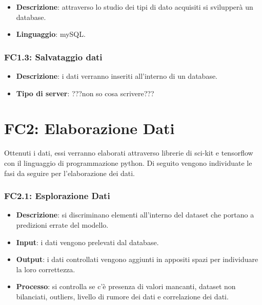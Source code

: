 \begin{itemize}
	\item \textbf{Descrizione}: attraverso lo studio dei tipi di dato acquisiti si svilupperà un database.
	\item \textbf{Linguaggio}: mySQL.
\end{itemize}

\subsubsection{FC1.3: Salvataggio dati}

\begin{itemize}
	\item \textbf{Descrizione}: i dati verranno inseriti all'interno di un database.
	\item \textbf{Tipo di server}: ???non so cosa scrivere???
\end{itemize}


\section{FC2: Elaborazione Dati}
Ottenuti i dati, essi verranno elaborati attraverso librerie di sci-kit e tensorflow con il linguaggio di programmazione python.
Di seguito vengono individuate le fasi da seguire per l'elaborazione dei dati.

\subsubsection{FC2.1: Esplorazione Dati}

\begin{itemize}
	\item \textbf{Descrizione}: si discriminano elementi all'interno del dataset che portano a predizioni errate del modello.
	\item \textbf{Input}: i dati vengono prelevati dal database.
	\item \textbf{Output}: i dati controllati vengono aggiunti in appositi spazi per individuare la loro correttezza.
	\item \textbf{Processo}: si controlla se c'è presenza di valori mancanti, dataset non bilanciati, outliers, livello di rumore dei dati e correlazione dei dati. %
\end{itemize}

